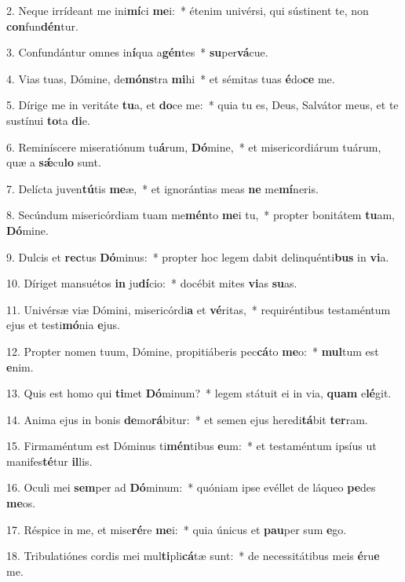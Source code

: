 2. Neque irrídeant me ini\textbf{mí}ci \textbf{me}i:~*  étenim univérsi, qui sústinent te, non \textbf{con}fun\textbf{dén}tur.\

3. Confundántur omnes in\textbf{í}qua a\textbf{gén}tes~*  \textbf{su}per\textbf{vá}cue.\

4. Vias tuas, Dómine, de\textbf{móns}tra \textbf{mi}hi~*  et sémitas tuas \textbf{é}do\textbf{ce} me.\

5. Dírige me in veritáte \textbf{tu}a, et \textbf{do}ce me:~*  quia tu es, Deus, Salvátor meus, et te sustínui \textbf{to}ta \textbf{di}e.\

6. Reminíscere miseratiónum tu\textbf{á}rum, \textbf{Dó}mine,~*  et misericordiárum tuárum, quæ a \textbf{sǽ}cu\textbf{lo} sunt.\

7. Delícta juven\textbf{tú}tis \textbf{me}æ,~*  et ignorántias meas \textbf{ne} me\textbf{mí}neris.\

8. Secúndum misericórdiam tuam me\textbf{mén}to \textbf{me}i tu,~*  propter bonitátem \textbf{tu}am, \textbf{Dó}mine.\

9. Dulcis et \textbf{rec}tus \textbf{Dó}minus:~*  propter hoc legem dabit delinquénti\textbf{bus} in \textbf{vi}a.\

10. Díriget mansuétos \textbf{in} ju\textbf{dí}cio:~*  docébit mites \textbf{vi}as \textbf{su}as.\

11. Univérsæ viæ Dómini, misericórdi\textbf{a} et \textbf{vé}ritas,~*  requiréntibus testaméntum ejus et testi\textbf{mó}nia \textbf{e}jus.\

12. Propter nomen tuum, Dómine, propitiáberis pec\textbf{cá}to \textbf{me}o:~*  \textbf{mul}tum est \textbf{e}nim.\

13. Quis est homo qui \textbf{ti}met \textbf{Dó}minum?~*  legem státuit ei in via, \textbf{quam} e\textbf{lé}git.\

14. Anima ejus in bonis \textbf{de}mo\textbf{rá}bitur:~*  et semen ejus heredi\textbf{tá}bit \textbf{ter}ram.\

15. Firmaméntum est Dóminus ti\textbf{mén}tibus \textbf{e}um:~*  et testaméntum ipsíus ut manifes\textbf{té}tur \textbf{il}lis.\

16. Oculi mei \textbf{sem}per ad \textbf{Dó}minum:~*  quóniam ipse evéllet de láqueo \textbf{pe}des \textbf{me}os.\

17. Réspice in me, et mise\textbf{ré}re \textbf{me}i:~*  quia únicus et \textbf{pau}per sum \textbf{e}go.\

18. Tribulatiónes cordis mei mul\textbf{ti}pli\textbf{cá}tæ sunt:~*  de necessitátibus meis \textbf{é}ru\textbf{e} me.\

